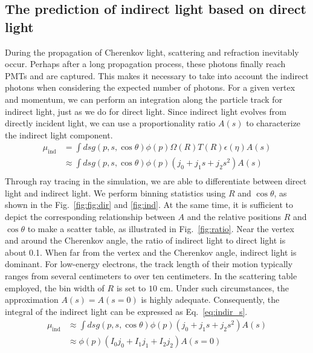 \subsection{The prediction of indirect light based on direct light}
During the propagation of Cherenkov light, scattering and refraction inevitably occur. Perhaps after a long propagation process, these photons finally reach PMTs and are captured. This makes it necessary to take into account the indirect photons when considering the expected number of photons. For a given vertex and momentum, we can perform an integration along the particle track for indirect light, just as we do for direct light. Since indirect light evolves from directly incident light, we can use a proportionality ratio $A(s)$ to characterize the indirect light component.
\begin{equation}
	\begin{aligned}
		\mu_{\mathrm{ind}} & =\int ds g(p,s,\cos\theta)\phi(p)\Omega(R)T(R)\epsilon(\eta)A(s) \\
		                   & \approx \int ds g(p,s,\cos\theta)\phi(p)(j_0 + j_1s+j_2s^2)A(s)  \\
	\end{aligned}
	\label{eq:indir}
\end{equation}
Through ray tracing in the simulation, we are able to differentiate between direct light and indirect light. We perform binning statistics using \(R\) and \(\cos\theta\), as shown in the Fig.~\ref{fig:fig:dir} and \ref{fig:ind}. At the same time, it is sufficient to depict the corresponding relationship between \(A\) and the relative positions \(R\) and \(\cos\theta\) to make a scatter table, as illustrated in Fig.~\ref{fig:ratio}. Near the vertex and around the Cherenkov angle, the ratio of indirect light to direct light is about 0.1. When far from the vertex and the Cherenkov angle, indirect light is dominant. For low-energy electrons, the track length of their motion typically ranges from several centimeters to over ten centimeters. In the scattering table employed, the bin width of \(R\) is set to \(10\) cm. Under such circumstances, the approximation \(A(s)=A(s = 0)\) is highly adequate. Consequently, the integral of the indirect light can be expressed as Eq.~\eqref{eq:indir_s}.
\begin{equation}
	\begin{aligned}
		\mu_{\mathrm{ind}} & \approx \int ds g(p,s,\cos\theta)\phi(p)(j_0 + j_1s+j_2s^2)A(s) \\
		                   & \approx \phi(p)(I_0j_0+I_1j_1+I_2j_2)A(s=0)                     \\
	\end{aligned}
	\label{eq:indir_s}
\end{equation}
